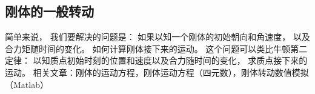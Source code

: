 

\begin{issues}
\issueDraft
\end{issues}


\subsection{刚体的一般转动}
简单来说， 我们要解决的问题是： 如果以知一个刚体的初始朝向和角速度， 以及合力矩随时间的变化。 如何计算刚体接下来的运动。 这个问题可以类比牛顿第二定律： 以知质点初始时刻的位置和速度以及合力随时间的变化， 求质点接下来的运动。 相关文章：刚体的运动方程，刚体运动方程（四元数），刚体转动数值模拟（Matlab）
